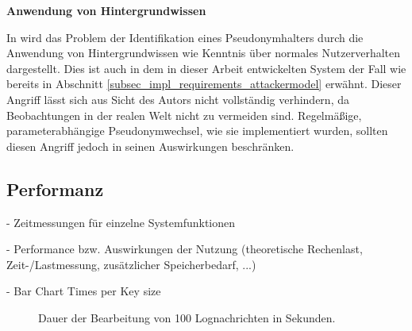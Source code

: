 
\textbf{Anwendung von Hintergrundwissen}

In \cite{lundin1999privacy} wird das Problem der Identifikation eines Pseudonymhalters durch die Anwendung von Hintergrundwissen wie Kenntnis über normales Nutzerverhalten dargestellt. Dies ist auch in dem in dieser Arbeit entwickelten System der Fall wie bereits in Abschnitt \ref{subsec_impl_requirements_attackermodel} erwähnt. Dieser Angriff lässt sich aus Sicht des Autors nicht vollständig verhindern, da Beobachtungen in der realen Welt nicht zu vermeiden sind.
Regelmäßige, parameterabhängige Pseudonymwechsel, wie sie implementiert wurden, sollten diesen Angriff jedoch in seinen Auswirkungen beschränken.



\subsection{Performanz}

- Zeitmessungen für einzelne Systemfunktionen

- Performance bzw. Auswirkungen der Nutzung (theoretische Rechenlast, Zeit-/Lastmessung, zusätzlicher Speicherbedarf, ...)


- Bar Chart Times per Key size
\begin{figure}[]
    \centering
    \caption{Dauer der Bearbeitung von 100 Lognachrichten in Sekunden.}
    \label{fig:eval_barchart}
\end{figure}

